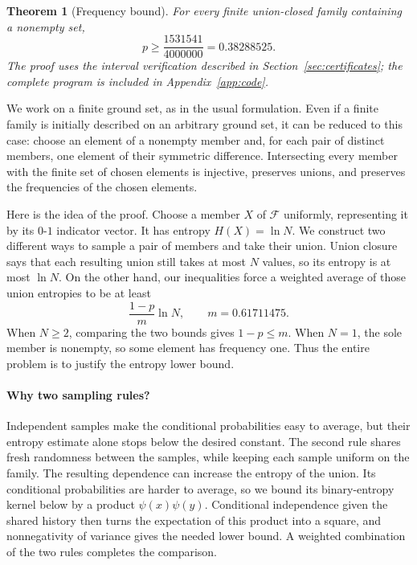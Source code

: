 \documentclass[11pt]{article}
\newtheorem{theorem}{Theorem}[section]
\theoremstyle{remark}
\newcommand{\F}{\mathcal F}
\begin{document}
\begin{theorem}[Frequency bound]\label{thm:main}
For every finite union-closed family containing a nonempty set,
\[
\boxed{\displaystyle p\ge\frac{1531541}{4000000}=0.38288525.}
\]
The proof uses the interval verification described in
Section~\ref{sec:certificates}; the complete program is included in
Appendix~\ref{app:code}.
\end{theorem}

We work on a finite ground set, as in the usual formulation. Even if
a finite family is initially described on an arbitrary ground set, it
can be reduced to this case: choose an element of a nonempty member and,
for each pair of distinct members, one element of their symmetric
difference. Intersecting every member with the finite set of chosen
elements is injective, preserves unions, and preserves the frequencies
of the chosen elements.

Here is the idea of the proof. Choose a member \(X\) of \(\F\) uniformly,
representing it by its \(0\)-\(1\) indicator vector. It has entropy
\(H(X)=\ln N\). We construct two different ways to sample a pair of
members and take their union. Union closure says that each resulting
union still takes at most \(N\) values, so its entropy is at most
\(\ln N\). On the other hand, our inequalities force a weighted average
of those union entropies to be at least
\[
\frac{1-p}{m}\ln N,\qquad m=0.61711475.
\]
When \(N\ge2\), comparing the two bounds gives \(1-p\le m\).
When \(N=1\), the sole member is nonempty, so some element has frequency
one. Thus the entire problem is to justify the entropy lower bound.

\paragraph{Why two sampling rules?}
Independent samples make the conditional probabilities easy to average,
but their entropy estimate alone stops below the desired constant.
The second rule shares fresh randomness between the samples, while
keeping each sample uniform on the family. The resulting dependence
can increase the entropy of the union. Its conditional probabilities
are harder to average, so we bound its binary-entropy kernel below by
a product \(\psi(x)\psi(y)\). Conditional independence given the
shared history then turns the expectation of this product into a
square, and nonnegativity of variance gives the needed lower bound.
A weighted combination of the two rules completes the comparison.
\end{document}
